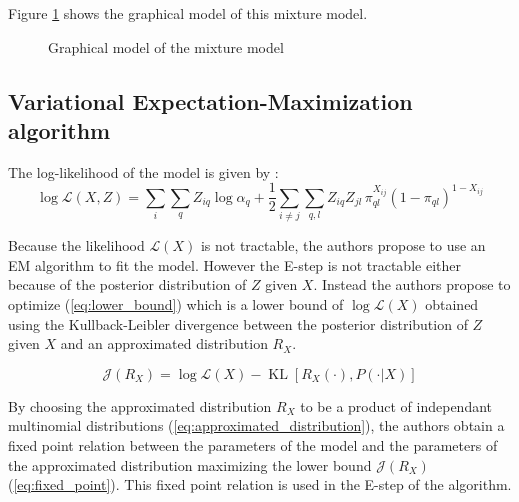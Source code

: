 \documentclass[10pt]{article}
\DeclareMathOperator*{\KL}{KL}
\begin{document}
Figure \ref{fig:graphical_model} shows the graphical model of this mixture model.

\begin{figure}[H]
    \centering
    \caption{Graphical model of the mixture model}
    \label{fig:graphical_model}
\end{figure}


\subsection{Variational Expectation-Maximization algorithm}

The log-likelihood of the model is given by :
\begin{equation}
    \log \mathcal{L}(X, Z) = \sum_{i}\sum_{q} Z_{iq}\log\alpha_q + \frac{1}{2}\sum_{i\neq j}\sum_{q,l} Z_{iq}Z_{jl} \, \pi_{ql}^{X_{ij}}(1-\pi_{ql})^{1-X_{ij}}
\end{equation}

Because the likelihood $\mathcal{L}(X)$ is not tractable, the authors propose to use an EM algorithm to fit the model. However the E-step is not tractable either because of the posterior distribution of $Z$ given $X$. Instead the authors propose to optimize (\ref{eq:lower_bound}) which is a lower bound of $\log\mathcal{L}(X)$ obtained using the Kullback-Leibler divergence between the posterior distribution of $Z$ given $X$ and an approximated distribution $R_X$.

\begin{equation}
    \label{eq:lower_bound}
    \mathcal{J}(R_X)=\log \mathcal{L}(X)-\KL[R_X(\cdot), P(\cdot|X)]
\end{equation}

By choosing the approximated distribution $R_X$ to be a product of independant multinomial distributions (\ref{eq:approximated_distribution}), the authors obtain a fixed point relation between the parameters of the model and the parameters of the approximated distribution maximizing the lower bound $\mathcal{J}(R_X)$ (\ref{eq:fixed_point}). This fixed point relation is used in the E-step of the algorithm.
\end{document}
